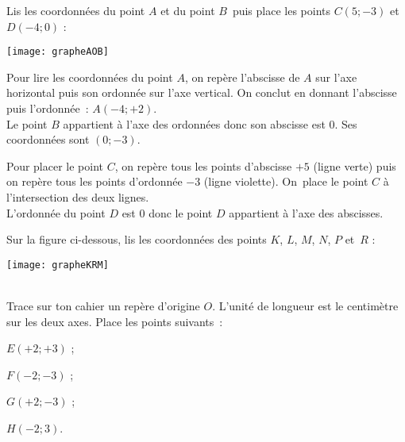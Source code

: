 \begin{methode*1}

\begin{exemple*1}
Lis les coordonnées du point $A$ et du point $B$ puis place les points $C(5 ; -3)$ et $D(-4 ; 0)$ :

\begin{center} \texttt{[image: grapheAOB]} \end{center}

Pour lire les coordonnées du point $A$, on repère l'abscisse de $A$ sur l'axe horizontal puis  son ordonnée sur l'axe vertical. On conclut en donnant l'abscisse puis l'ordonnée : $A (-4 ; +2)$. \\[0.5em]
Le point $B$ appartient à l'axe des ordonnées donc son abscisse est 0. Ses coordonnées sont $(0 ; -3)$.

Pour placer le point $C$, on repère tous les points d'abscisse $+5$ (ligne verte) puis on repère tous les points d'ordonnée $-3$ (ligne violette). On place le point $C$ à l'intersection des deux lignes. \\[0.5em]
L'ordonnée du point $D$ est 0 donc le point $D$ appartient à l'axe des abscisses.
\end{exemple*1}

\exercice 
\begin{minipage}[c]{0.45\linewidth}
Sur la figure ci-dessous, lis les coordonnées des points $K$, $L$, $M$, $N$, $P$ et $R$ :
 \end{minipage} \hfill%
 \begin{minipage}[c]{0.4\linewidth}
 
 \begin{center} \texttt{[image: grapheKRM]} \end{center}
  \end{minipage} \\

\exercice Trace sur ton cahier un repère d'origine $O$. L'unité de longueur est le centimètre sur les deux axes. Place les points suivants :
\begin{colenumerate}{4}
 \item $E(+2 ; +3)$ ;
 \item $F(-2 ; -3)$ ;
 \item $G(+2 ; -3)$ ;
 \item $H(-2 ; 3)$.
 \end{colenumerate}

\end{methode*1}


